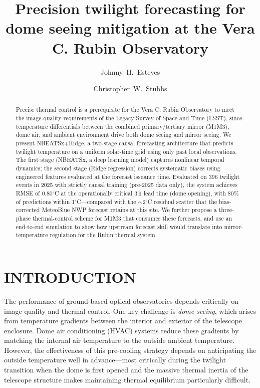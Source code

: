 \documentclass[]{spie}  %
\title{Precision twilight forecasting for dome seeing mitigation at the Vera C. Rubin Observatory}
\author[a]{Johnny~H.~Esteves}
\author[a]{Christopher~W.~Stubbs}
\affil[a]{Department of Physics, Harvard University, Cambridge, MA 02138, USA}
\newcommand{\degC}{$^{\circ}$C}
\begin{document}
\maketitle

\begin{abstract}
Precise thermal control is a prerequisite for the Vera C. Rubin Observatory to meet the image-quality requirements of the Legacy Survey of Space and Time (LSST), since temperature differentials between the combined primary/tertiary mirror (M1M3), dome air, and ambient environment drive both dome seeing and mirror seeing. We present NBEATSx+Ridge, a two-stage causal forecasting architecture that predicts twilight temperature on a uniform solar-time grid using only past local observations. The first stage (NBEATSx, a deep learning model) captures nonlinear temporal dynamics; the second stage (Ridge regression) corrects systematic biases using engineered features evaluated at the forecast issuance time. Evaluated on 396 twilight events in 2025 with strictly causal training (pre-2025 data only), the system achieves RMSE of 0.80\degC{} at the operationally critical 3\,h lead time (dome opening), with 80\% of predictions within 1\degC{}---compared with the $\sim$2\degC{} residual scatter that the bias-corrected MeteoBlue NWP forecast retains at this site. We further propose a three-phase thermal-control scheme for M1M3 that consumes these forecasts, and use an end-to-end simulation to show how upstream forecast skill would translate into mirror-temperature regulation for the Rubin thermal system.
\end{abstract}


\section{INTRODUCTION}
\label{sec:intro}

The performance of ground-based optical observatories depends critically on image quality and thermal control. One key challenge is \emph{dome seeing}, which arises from temperature gradients between the interior and exterior of the telescope enclosure.\cite{Racine1991, Emelianov2015} Dome air conditioning (HVAC) systems reduce these gradients by matching the internal air temperature to the outside ambient temperature. However, the effectiveness of this pre-cooling strategy depends on anticipating the outside temperature well in advance---most critically during the twilight transition when the dome is first opened and the massive thermal inertia of the telescope structure makes maintaining thermal equilibrium particularly difficult.
\end{document}
